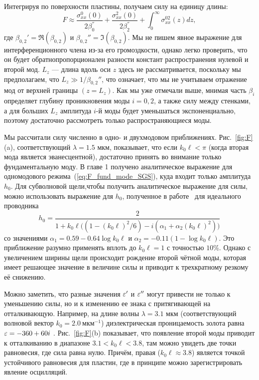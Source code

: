 Интегрируя по поверхности пластины, получаем силу на единицу длины:
\begin{equation}
  F \approx \frac{\sigma_{xx}^0(0)}{2 \beta_0^{''}} + \frac{\sigma_{xx}^2(0)}{2 \beta_2^{''}} + \int_{0}^{\infty}\sigma_{xx}^{02}(z)dz,
\end{equation}
где $\beta_{0,2}'=\Re(\beta_{0,2})$ и $\beta_{0,2}''=\Im(\beta_ {0,2 })$. Мы не пишем явное выражение для интерференционного члена из-за его громоздкости, однако легко проверить, что он будет обратнопропорционален разности констант распространения нулевой и второй мод. $L_z$ --- длина вдоль оси $z$ здесь не рассматривается, поскольку мы предполагаем, что $L_z\gg1/\beta_{0,2}''$, что означает, что мы не учитываем отражение мод от верхней границы $(z = L_z)$. Как мы уже отмечали выше, мнимая часть $\beta_i$ определяет глубину проникновения моды $i = 0,2$, а также силу между стенками, а для больших $L_z$ амплитуда $i$-й моды будет уменьшаться экспоненциально, поэтому достаточно рассмотреть только распространяющиеся моды.
 
 Мы рассчитали силу численно в одно- и двухмодовом приближениях. Рис.~\ref{fig:F}(a), соответствующий $\lambda = 1.5$ мкм, показывает, что если $k_0\ell <\pi$
(когда вторая мода является эванесцентной), достаточно принять во внимание только фундаментальную моду. В главе 1 получено аналитическое выражение для одномодового режима~(\ref{eq:F_fund_mode_SGS}),  куда входит только амплитуда $h_0$. Для субволновой щели,чтобы получить аналитическое выражение для силы, можно использовать выражение для $h_0$, полученное в работе~\cite{Shapiro16} для идеального проводника
\begin{equation}
    h_0 = \frac{2}{1 + k_0\ell\Big( (1 - (k_0\ell)^2/6) -i(\alpha_1 + \alpha_2 (k_0\ell)^2)  \Big)}
\end{equation}
со значениями $\alpha_1 = 0.59 - 0.64\log{k_0 \ell}$ и $\alpha_2 = -0.11(1-\log{k_0 \ell})$.
Это приближение разумно применять вплоть до $k_0 \ell=1$ с точностью $10\%$. 
Однако с увеличением ширины щели происходит рождение второй чётной моды, которая имеет решающее значение в величине силы и приводит к трехкратному резкому её снижению. 

Можно заметить, что разные значения $\varepsilon'$ и $\varepsilon''$ могут привести не только к уменьшению силы, но и к изменению ее знака с притягивающей на отталкивающую. Например, на длине волны $\lambda = 3.1$ мкм (соответствующий волновой вектор $k_0 = 2.0~\text{мкм}^{-1}$) диэлектрическая проницаемость золота равна $\varepsilon = -360 + 60i$ \cite{Palik98}. Рис.~\ref{fig:F}(b) показывает, что появление второй моды приводит к отталкиванию в диапазоне $3.1 <k_0\ell<3.8$,
там можно увидеть две точки равновесия, где сила равна нулю. Причём, правая ($k_0 \ell \approx 3.8$) является точкой устойчивого равновесия для пластин, где
в  принципе можно зарегистрировать явление осцилляций. 

